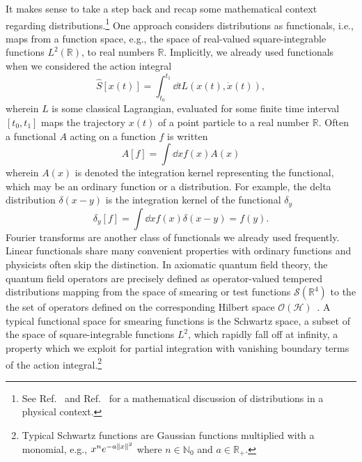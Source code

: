It makes sense to take a step back and recap some mathematical context regarding distributions.\footnote{See Ref.~\cite[p.~590]{Zeidler2016} and Ref.~\cite[p.~193]{Mukhanov2007} for a mathematical discussion of distributions in a physical context.}
One approach considers distributions as functionals, i.e., maps from a function space, e.g., the space of real-valued square-integrable functions $L^2(\mathbb{R})$, to real numbers $\mathbb{R}$.
Implicitly, we already used functionals when we considered the action integral
\begin{equation}
	\hat{S}\left[x(t)\right]
	=
	\int_{t_0}^{t_1}\dd{t}
	L\left(x(t),\dot{x}(t)\right)
	,
\end{equation}
wherein $L$ is some classical Lagrangian, evaluated for some finite time interval $[t_0,t_1]$ maps the trajectory $x(t)$ of a point particle to a real number $\mathbb{R}$.
Often a functional $A$ acting on a function $f$ is written
\begin{equation}
	A[f]
	=
	\int\dd{x}
	f(x)A(x)
	\label{eq:functional}
\end{equation}
wherein $A(x)$ is denoted the integration kernel representing the functional, which may be an ordinary function or a distribution.
For example, the delta distribution $\delta(x-y)$ is the integration kernel of the functional $\delta_y$
\begin{equation}
	\delta_{y}[f]
	=
	\int\dd{x}
	f(x)
	\delta(x-y)
	=
	f(y)
	.
\end{equation}
Fourier transforms are another class of functionals we already used frequently.
Linear functionals share many convenient properties with ordinary functions and physicists often skip the distinction.
In axiomatic quantum field theory, the quantum field operators are precisely defined as operator-valued tempered distributions mapping from the space of smearing or test functions $\mathcal{S}(\mathbb{R}^4)$ to the the set of operators defined on the corresponding Hilbert space $\mathcal{O}(\mathcal{H})$~\cite[p.~56]{Haag2012}.
A typical functional space for smearing functions is the Schwartz space, a subset of the space of square-integrable functions $L^2$, which rapidly fall off at infinity, a property which we exploit for partial integration with vanishing boundary terms of the action integral.\footnote{Typical Schwartz functions are Gaussian functions multiplied with a monomial, e.g., $x^ne^{-a\lVert x\rVert^2}$ where $n\in\mathbb{N}_0$ and $a\in\mathbb{R}_+$.}

